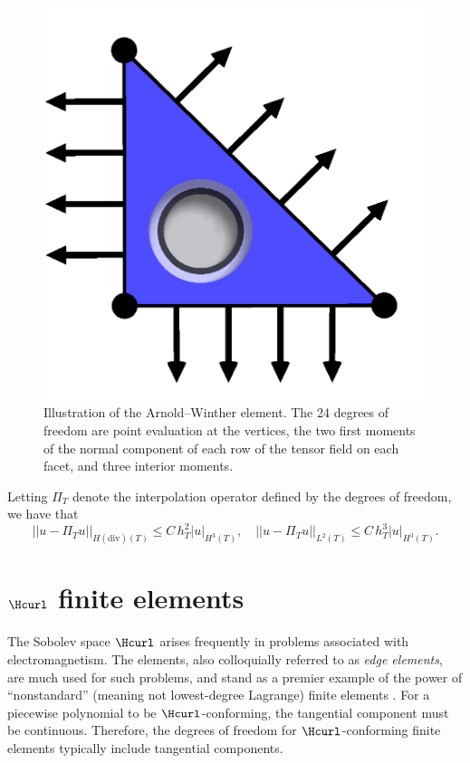 \begin{figure}
  \begin{center}
   \includegraphics[width=\elmfigsizesingle]{chapters/kirby-6/png/AW_2d.png}
    \caption{Illustration of the Arnold--Winther element. The
        24 degrees of freedom are point evaluation at the vertices,
        the two first moments of the normal component of each row of
        the tensor field on each facet, and three interior moments.}
  \end{center}
\end{figure}

Letting $\Pi_T$ denote the interpolation operator defined by the
degrees of freedom, we have that
\begin{equation}
  ||u - \Pi_T u||_{H(\mathrm{div})(T)} \leqslant C \, h_T^2 |u|_{H^{3}(T)}, \quad
  ||u - \Pi_T u||_{L^2(T)} \leqslant C \, h_T^{3} |u|_{H^3(T)}.
\end{equation}

\section{$\Hcurl$ finite elements}

The Sobolev space $\Hcurl$ arises frequently in problems associated
with electromagnetism. The \nedelec{} elements, also colloquially
referred to as \emph{edge elements}, are much used for such problems,
and stand as a premier example of the power of ``nonstandard''
(meaning not lowest-degree Lagrange) finite elements
\citep{Nedelec1980,Nedelec1986}. For a piecewise polynomial to be
$\Hcurl$-conforming, the tangential component must be
continuous. Therefore, the degrees of freedom for $\Hcurl$-conforming
finite elements typically include tangential components.

